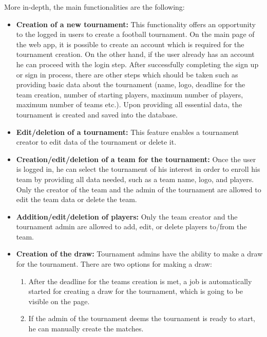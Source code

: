 \noindent More in-depth, the main functionalities are the following:
\begin{itemize}
    \item \textbf{Creation of a new tournament:}
        This functionality offers an opportunity to the logged in users to create a football tournament. On the main page of the web app, it is possible to create an account which is required for the tournament creation. On the other hand, if the user already has an account he can proceed with the login step. After successfully completing the sign up or sign in process, there are other steps which should be taken such as providing basic data about the tournament (name, logo, deadline for the team creation, number of starting players, maximum number of players, maximum number of teams etc.). Upon providing all essential data, the tournament is created and saved into the database.

        \item \textbf{Edit/deletion of a tournament:}
        This feature enables a tournament creator to edit data of the tournament or delete it.

    \item \textbf{Creation/edit/deletion of a team for the tournament:}
        Once the user is logged in, he can select the tournament of his interest in order to enroll his team by providing all data needed, such as a team name, logo, and players. Only the creator of the team and the admin of the tournament are allowed to edit the team data or delete the team.

    \item \textbf{Addition/edit/deletion of players:}
        Only the team creator and the tournament admin are allowed to add, edit, or delete players to/from the team.

    \item \textbf{Creation of the draw:}
        Tournament admins have the ability to make a draw for the tournament. There are two options for making a draw:
        \begin{enumerate}
            \item After the deadline for the teams creation is met, a job is automatically started for creating a draw for the tournament, which is going to be visible on the page.
            \item If the admin of the tournament deems the tournament is ready to start, he can manually create the matches.
        \end{enumerate}


\end{itemize}
